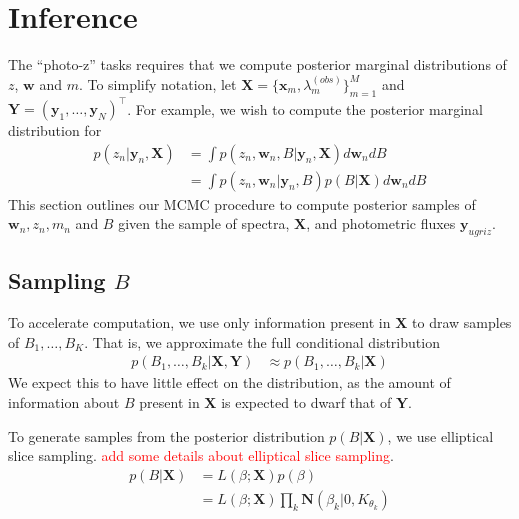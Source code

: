 \documentclass{article}
\newcommand{\trans}{\intercal}
\newcommand{\red}[1]{\textcolor{red}{#1}}
\begin{document}
\section{Inference}
The ``photo-z'' tasks requires that we compute posterior marginal distributions of $z$, $\mathbf{w}$ and $m$.  To simplify notation, let $\mathbf{X} = \{\mathbf{x}_m, \lambda^{(obs)}_m \}_{m=1}^M$ and $\mathbf{Y} = ( \mathbf{y}_1, \dots, \mathbf{y}_N )^\trans$.   
For example, we wish to compute the posterior marginal distribution for
\begin{align}
  p(z_n | \mathbf{y}_n, \mathbf{X}) 
    &= \int p(z_n, \mathbf{w}_n, B | \mathbf{y}_n, \mathbf{X}) d\mathbf{w}_n dB \\
    &= \int p(z_n, \mathbf{w}_n | \mathbf{y}_n, B) p(B | \mathbf{X}) d\mathbf{w}_n dB
\end{align}
This section outlines our MCMC procedure to compute posterior samples of $\mathbf{w}_n, z_n, m_n$ and $B$ given the sample of spectra, $\mathbf{X}$, and photometric fluxes $\mathbf{y}_{ugriz}$.  

\subsection{Sampling $B$}
To accelerate computation, we use only information present in $\mathbf{X}$ to draw samples of $B_1, \dots, B_K$.  That is, we approximate the full conditional distribution 
\begin{align}
  p(B_1,\dots, B_k | \mathbf{X}, \mathbf{Y}) 
    &\approx p(B_1, \dots, B_k | \mathbf{X})
\end{align}
We expect this to have little effect on the distribution, as the amount of information about $B$ present in $\mathbf{X}$ is expected to dwarf that of $\mathbf{Y}$.  

To generate samples from the posterior distribution $p(B | \mathbf{X})$, we use elliptical slice sampling.  \red{add some details about elliptical slice sampling}. 
\begin{align}
  p(B | \mathbf{X}) 
    &= L(\beta; \mathbf{X}) p(\beta) \\
    &= L(\beta; \mathbf{X}) \prod_{k} \mathbf{N}(\beta_k | 0, K_{\theta_k})
\end{align}
\end{document}
